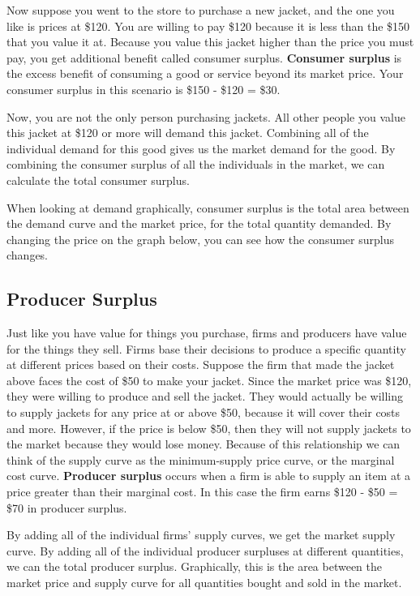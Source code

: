 \documentclass[
]{book}
\begin{document}
Now suppose you went to the store to purchase a new jacket, and the one you like is prices at \$120. You are willing to pay \$120 because it is less than the \$150 that you value it at. Because you value this jacket higher than the price you must pay, you get additional benefit called consumer surplus. \textbf{Consumer surplus} is the excess benefit of consuming a good or service beyond its market price. Your consumer surplus in this scenario is \$150 - \$120 = \$30.

Now, you are not the only person purchasing jackets. All other people you value this jacket at \$120 or more will demand this jacket. Combining all of the individual demand for this good gives us the market demand for the good. By combining the consumer surplus of all the individuals in the market, we can calculate the total consumer surplus.

When looking at demand graphically, consumer surplus is the total area between the demand curve and the market price, for the total quantity demanded. By changing the price on the graph below, you can see how the consumer surplus changes.

\subsection{Producer Surplus}\label{producer-surplus}

Just like you have value for things you purchase, firms and producers have value for the things they sell. Firms base their decisions to produce a specific quantity at different prices based on their costs. Suppose the firm that made the jacket above faces the cost of \$50 to make your jacket. Since the market price was \$120, they were willing to produce and sell the jacket. They would actually be willing to supply jackets for any price at or above \$50, because it will cover their costs and more. However, if the price is below \$50, then they will not supply jackets to the market because they would lose money. Because of this relationship we can think of the supply curve as the minimum-supply price curve, or the marginal cost curve. \textbf{Producer surplus} occurs when a firm is able to supply an item at a price greater than their marginal cost. In this case the firm earns \$120 - \$50 = \$70 in producer surplus.

By adding all of the individual firms' supply curves, we get the market supply curve. By adding all of the individual producer surpluses at different quantities, we can the total producer surplus. Graphically, this is the area between the market price and supply curve for all quantities bought and sold in the market.
\end{document}

